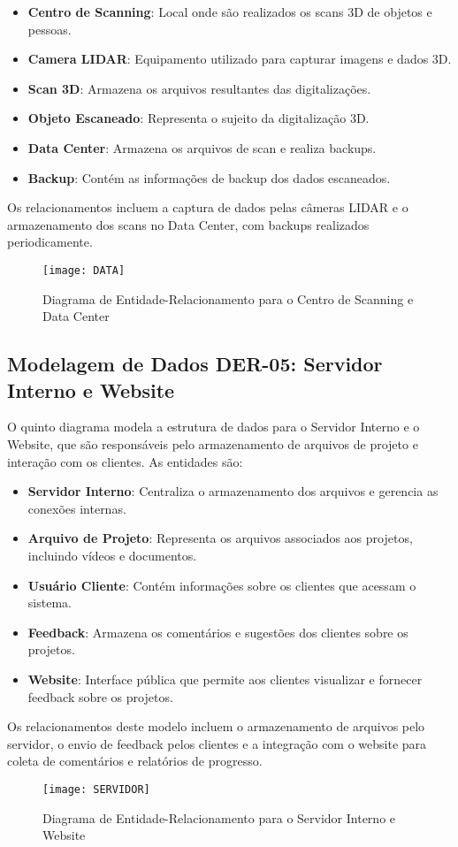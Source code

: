 \begin{itemize}
    \item \textbf{Centro de Scanning}: Local onde são realizados os scans 3D de objetos e pessoas.
    \item \textbf{Camera LIDAR}: Equipamento utilizado para capturar imagens e dados 3D.
    \item \textbf{Scan 3D}: Armazena os arquivos resultantes das digitalizações.
    \item \textbf{Objeto Escaneado}: Representa o sujeito da digitalização 3D.
    \item \textbf{Data Center}: Armazena os arquivos de scan e realiza backups.
    \item \textbf{Backup}: Contém as informações de backup dos dados escaneados.
\end{itemize}

Os relacionamentos incluem a captura de dados pelas câmeras LIDAR e o armazenamento dos scans no Data Center, com backups realizados periodicamente.

\begin{figure}[ht]
    \centering
    \texttt{[image: DATA]}
    \caption{Diagrama de Entidade-Relacionamento para o Centro de Scanning e Data Center}
    \label{fig:data}
\end{figure}

\subsection{Modelagem de Dados DER-05: Servidor Interno e Website}
O quinto diagrama modela a estrutura de dados para o Servidor Interno e o Website, que são responsáveis pelo armazenamento de arquivos de projeto e interação com os clientes. As entidades são:

\begin{itemize}
    \item \textbf{Servidor Interno}: Centraliza o armazenamento dos arquivos e gerencia as conexões internas.
    \item \textbf{Arquivo de Projeto}: Representa os arquivos associados aos projetos, incluindo vídeos e documentos.
    \item \textbf{Usuário Cliente}: Contém informações sobre os clientes que acessam o sistema.
    \item \textbf{Feedback}: Armazena os comentários e sugestões dos clientes sobre os projetos.
    \item \textbf{Website}: Interface pública que permite aos clientes visualizar e fornecer feedback sobre os projetos.
\end{itemize}

Os relacionamentos deste modelo incluem o armazenamento de arquivos pelo servidor, o envio de feedback pelos clientes e a integração com o website para coleta de comentários e relatórios de progresso.

\begin{figure}[ht]
    \centering
    \texttt{[image: SERVIDOR]}
    \caption{Diagrama de Entidade-Relacionamento para o Servidor Interno e Website}
    \label{fig:servidor}
\end{figure}

